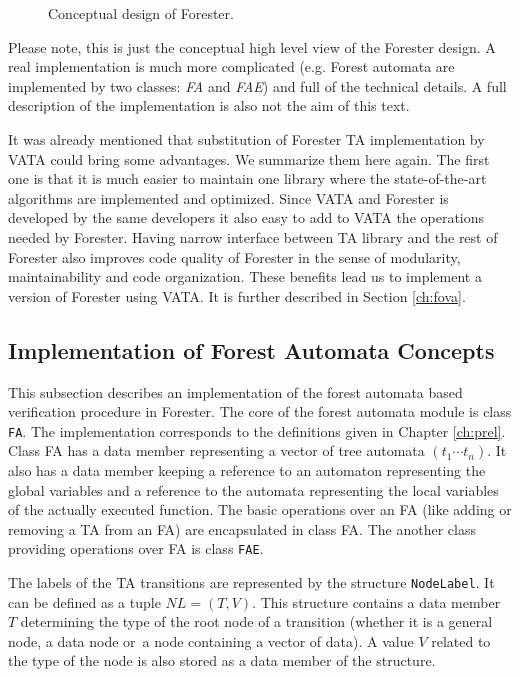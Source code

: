 \begin{figure}[bt]
	\begin{center}
		
	\end{center}
	\caption{Conceptual design of Forester.}
	\label{fig:fa_design}
\end{figure}

Please note, this is just the conceptual high level view of the Forester design.
A real implementation is much more complicated (e.g. Forest automata are implemented by two classes: \emph{FA} and \emph{FAE})
and full of the technical details.
A full description of the implementation is also not the aim of this text.

It was already mentioned that substitution of Forester TA implementation by
VATA could bring some advantages.
We summarize them here again.
The first one is that it is much easier to maintain one library where
the state-of-the-art algorithms are implemented and optimized.
Since VATA and Forester is developed by the same developers it also easy to add
to VATA the operations needed by Forester.
Having narrow interface between TA library and the rest of Forester
also improves code quality of Forester in the sense of modularity, maintainability and code organization.
These benefits lead us to implement a version of Forester using VATA.
It is further described in Section \ref{ch:fova}.


\subsection{Implementation of Forest Automata Concepts}
\label{subsec:faimpl}

This subsection describes an implementation of the forest automata 
based verification procedure in Forester.
The core of the forest automata module is class {\tt FA}.
The implementation corresponds to the definitions given in Chapter \ref{ch:prel}.
Class FA has a data member representing a vector of tree automata $(t_1 \cdots t_n)$.
It also has a data member keeping a reference to an automaton representing the global variables
and a reference to the automata representing the local variables of the actually executed function. %
The basic operations over an FA (like adding or removing a TA from an FA) are encapsulated in class FA.
The another class providing operations over FA is class {\tt FAE}. 

The labels of the TA transitions are represented by the structure {\tt NodeLabel}.
It can be defined as a tuple $NL=(T,V)$.
This structure contains a data member $T$ determining the type of the root node of a transition
(whether it is a general node, a data node or~a node containing a vector of data).
A value $V$ related to the type of the node is also stored as a data member of the structure.

